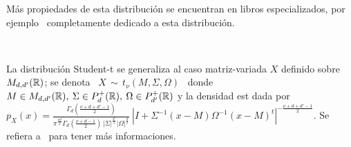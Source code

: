 
M\'as propiedades de esta distribuci\'on se encuentran en libros especializados,
por ejemplo~\cite{KotNad04} completamente dedicado a esta distribuci\'on.

\

La distribuci\'on  Student-t se generaliza  al caso matriz-variada  $X$ definido
sobre $M_{d,d'}(\mathbb{R})$;  se denota  \ $X \,  \sim \,  t_\nu(M,\Sigma,\Omega)$ \
donde  \ $M  \in  M_{d,d'}(\mathbb{R}), \:  \Sigma  \in P_d^+(\mathbb{R}),  \: \Omega  \in
P_{d'}^+(\mathbb{R})$   y  la  densidad   est  dada   por  $\displaystyle   p_X(x)  =
\frac{\Gamma_d\left(      \frac{\nu+d+d'-1}{2}\right)}{\pi^{\frac{\nu     d}{2}}
  \Gamma_d\left(       \frac{\nu+d-1}{2}\right)      \,       \left|      \Sigma
  \right|^{\frac{d'}{2}}  \left|  \Omega \right|^{\frac{d}{2}}}  \:  \left| I  +
  \Sigma^{-1}  (x-M) \Omega^{-1}  (x-M)^t \right|^{-  \frac{\nu+d+d'-1}{2}}$. Se
refiera a~\cite[Cap.~4]{GupNag99} para tener m\'as informaciones.
